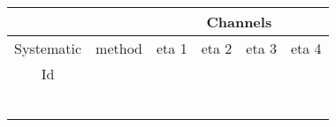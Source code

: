 \documentclass[12pt]{article}
\begin{document}
\begin{table}[]
\begin{tabular}{|l|l|l|l|l|l|l|l|}
\hline
\multicolumn{1}{|c|}{}                    &                             & \multicolumn{6}{c|}{Channels}                                                                                     \\ \hline 
\multicolumn{1}{|c|}{Systematic}          & \multicolumn{1}{c|}{method} & \multicolumn{3}{c|}{eta 1} & \multicolumn{1}{c|}{eta 2} & \multicolumn{1}{c|}{eta 3} & \multicolumn{1}{c|}{eta 4} \\ \hline     
\multicolumn{1}{|c|}{\multirow{2}{*}{Id}} &                             & \multicolumn{3}{l|}{}      &                            &                            &                            \\ \cline{2-8} 
\multicolumn{1}{|c|}{}                    &                             & \multicolumn{3}{l|}{}      &                            &                            &                            \\ \hline
\multirow{2}{*}{}                         &                             & \multicolumn{3}{l|}{}      &                            &                            &                            \\ \cline{2-8} 
                                  &                         & \multicolumn{3}{l|}{}       &                            &                            &                            \\ \hline 
\multirow{2}{*}{}                         &                             & \multicolumn{3}{l|}{}      &                            &                            &                            \\ \cline{2-8}
                                  &                         & \multicolumn{3}{l|}{}       &                            &                            &                            \\ \hline 
\multirow{2}{*}{}                         &                             & \multicolumn{3}{l|}{}      &                            &                            &                            \\ \cline{2-8} 
                                  &                         & \multicolumn{3}{l|}{}       &                            &                            &                            \\ \hline 
\end{tabular}
\end{table}
\end{document}
